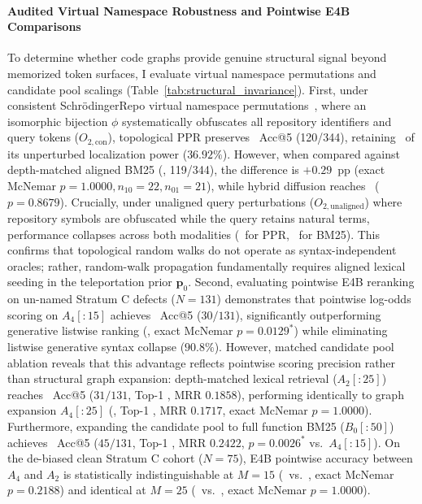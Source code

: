 \documentclass[10pt]{article}
\begin{document}
\paragraph{Audited Virtual Namespace Robustness and Pointwise E4B Comparisons}
To determine whether code graphs provide genuine structural signal beyond memorized token surfaces, I evaluate virtual namespace permutations and candidate pool scalings (Table~\ref{tab:structural_invariance}).
First, under consistent Schr{\"o}dingerRepo virtual namespace permutations~\cite{chen2024schrodinger}, where an isomorphic bijection $\phi$ systematically obfuscates all repository identifiers and query tokens ($O_{2,\text{con}}$), topological PPR preserves \HonestLevelTwoConsistentPPRAccFive\ Acc@5 (120/344), retaining \HonestLevelTwoConsistentPPRRetentionPct\ of its unperturbed localization power ($36.92\%$). However, when compared against depth-matched aligned BM25 (\HonestLevelTwoConsistentBMTwentyFiveAccFive, 119/344), the difference is $+0.29$~pp (exact McNemar $p = 1.0000, n_{10}=22, n_{01}=21$), while hybrid diffusion reaches \HonestLevelTwoConsistentHybridAccFive\ ($p = 0.8679$). Crucially, under unaligned query perturbations ($O_{2,\text{unaligned}}$) where repository symbols are obfuscated while the query retains natural terms, performance collapses across both modalities (\HonestLevelTwoUnalignedPPRAccFive\ for PPR, \HonestLevelTwoUnalignedBMTwentyFiveAccFive\ for BM25). This confirms that topological random walks do not operate as syntax-independent oracles; rather, random-walk propagation fundamentally requires aligned lexical seeding in the teleportation prior $\mathbf{p}_0$.
Second, evaluating pointwise E4B reranking on un-named Stratum C defects ($N=131$) demonstrates that pointwise log-odds scoring on $A_4[:15]$ achieves \HonestEFourBAFourFifteenAccFive\ Acc@5 ($30/131$), significantly outperforming generative listwise ranking (\CausalCOneAccFive, exact McNemar $p = 0.0129^*$) while eliminating listwise generative syntax collapse ($90.8\%$). However, matched candidate pool ablation reveals that this advantage reflects pointwise scoring precision rather than structural graph expansion: depth-matched lexical retrieval ($A_2[:25]$) reaches \HonestEFourBATwoTwentyFiveAccFive\ Acc@5 ($31/131$, Top-1 \HonestEFourBATwoTwentyFiveTopOne, MRR $0.1858$), performing identically to graph expansion $A_4[:25]$ (\HonestEFourBAFourTwentyFiveAccFive, Top-1 \HonestEFourBAFourTwentyFiveTopOne, MRR $0.1717$, exact McNemar $p = 1.0000$). Furthermore, expanding the candidate pool to full function BM25 ($B_0[:50]$) achieves \HonestEFourBBZeroFiftyAccFive\ Acc@5 ($45/131$, Top-1 \CausalCTwoAccFive, MRR $0.2422$, $p = 0.0026^*$ vs.\ $A_4[:15]$). On the de-biased clean Stratum C cohort ($N=75$), E4B pointwise accuracy between $A_4$ and $A_2$ is statistically indistinguishable at $M=15$ (\HonestCleanSeventyFiveAFourFifteenAccFive\ vs.\ \HonestCleanSeventyFiveATwoFifteenAccFive, exact McNemar $p = 0.2188$) and identical at $M=25$ (\HonestCleanSeventyFiveAFourTwentyFiveAccFive\ vs.\ \HonestCleanSeventyFiveATwoTwentyFiveAccFive, exact McNemar $p = 1.0000$).
\end{document}
